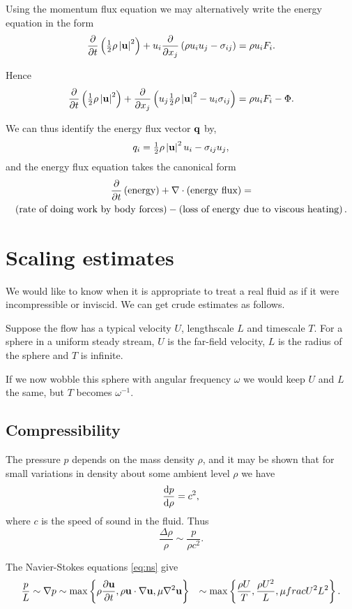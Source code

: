 \documentclass{notes}
\theoremstyle{plain}
\begin{document}
Using the momentum flux equation we may alternatively write the energy
equation in the form
\[
\frac{\partial }{\partial t} \left( \tfrac{1}{2} \rho \left|\mathbf{u}\right|^2 \right) + u_i \frac{\partial }{\partial x_j} \left(
\rho u_i u_j - \sigma_{i j} \right) = \rho u_i F_i.
\]

Hence
\[
\frac{\partial }{\partial t} \left( \tfrac{1}{2} \rho \left|\mathbf{u}\right|^2 \right) + \frac{\partial }{\partial x_j} \left(
u_j \tfrac{1}{2} \rho \left|\mathbf{u}\right|^2 - u_i \sigma_{i j} \right) = \rho u_i F_i
- \Phi.
\]

We can thus identify the energy flux vector $\mathbf{q}$ by,
\[
q_i = \tfrac{1}{2} \rho \left|\mathbf{u}\right|^2 u_i  - \sigma_{i j} u_j,
\]
and the energy flux equation takes the canonical form
\begin{multline*}
\frac{\partial }{\partial t} \left(\text{energy}\right) + \nabla \cdot \left(\text{energy flux} \right)
=\\ \left( \text{rate of doing work by body forces} \right) -
\left( \text{loss of energy due to viscous heating} \right).
\end{multline*}

\section{Scaling estimates}

We would like to know when it is appropriate to treat a real fluid as if
it were incompressible or inviscid.  We can get crude estimates as follows.

Suppose the flow has a typical velocity $U$, lengthscale $L$ and timescale
$T$.  For a sphere in a uniform steady stream, $U$ is the far-field velocity,
$L$ is the radius of the sphere and $T$ is infinite.

If we now wobble this sphere with angular frequency $\omega$ we would keep
$U$ and $L$ the same, but $T$ becomes $\omega^{-1}$.

\subsection{Compressibility}

The pressure $p$ depends on the mass density $\rho$, and it may be shown that
for small variations in density about some ambient level $\rho$ we have
\[
\frac{\mathrm{d} p}{\mathrm{d}\rho} = c^2,
\] 
where $c$ is the speed of sound in the fluid.  Thus
\[
\frac{\Delta \rho}{\rho} \sim \frac{p}{\rho c^2}.
\]

The Navier-Stokes equations \eqref{eq:ns} give
\begin{align*}
\frac{p}{L} \sim \nabla p &\sim \max \left\{ \rho \frac{\partial \mathbf{u}}{\partial t},
\rho \mathbf{u} \cdot \nabla \mathbf{u}, \mu \nabla^2 \mathbf{u}  \right\}
& \sim \max \left\{\frac{\rho U}{T}, \frac{\rho U^2}{L}, \mu frac{U^2}{L^2}
\right\}.
\end{align*}
\end{document}
